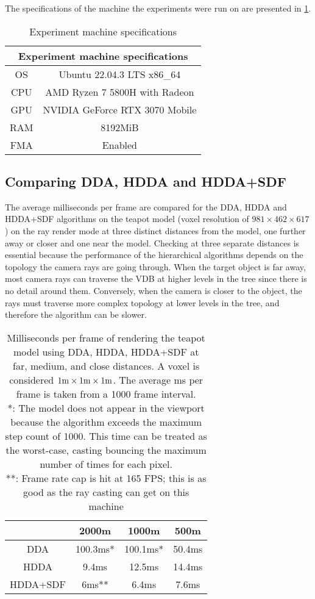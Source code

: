 The specifications of the machine the experiments were run on are presented in \cref{specs}.
\begin{table}[h]
  \centering
\begin{tabular}{|c||c|}
  \hline
  \multicolumn{2}{|c|}{Experiment machine specifications} \\
  \hline
  OS & Ubuntu 22.04.3 LTS x86\_64\\
  \hline
  CPU & AMD Ryzen 7 5800H with Radeon\\
  \hline
  GPU &  NVIDIA GeForce RTX 3070 Mobile\\
  \hline
  RAM & 8192MiB \\
  \hline
  FMA & Enabled \\
  \hline
\end{tabular}
  \caption{Experiment machine specifications}
  \label{specs}
\end{table}

\subsection{Comparing DDA, HDDA and HDDA+SDF}

The average milliseconds per frame are compared for the DDA, HDDA and HDDA+SDF algorithms on the teapot model (voxel resolution of $981\times462\times617$) on the ray render mode at three distinct distances from the model, one further away or closer and one near the model. Checking at three separate distances is essential because the performance of the hierarchical algorithms depends on the topology the camera rays are going through. When the target object is far away, most camera rays can traverse the VDB at higher levels in the tree since there is no detail around them. Conversely, when the camera is closer to the object, the rays must traverse more complex topology at lower levels in the tree, and therefore the algorithm can be slower.

\begin{table}[h]
  \centering
  \begin{tabular}{|c||c|c|c|}
    \hline
    & 2000m & 1000m & 500m \\
    \hline
    DDA & 100.3ms* & 100.1ms* & 50.4ms \\
    \hline
    HDDA & 9.4ms & 12.5ms & 14.4ms \\
    \hline
    HDDA+SDF & 6ms** & 6.4ms & 7.6ms\\
    \hline
  \end{tabular}
  \caption{Milliseconds per frame of rendering the teapot model using DDA, HDDA, HDDA+SDF at far, medium, and close distances. A voxel is considered $1\rm{m}\times1\rm{m}\times1\rm{m}$. The average ms per frame is taken from a 1000 frame interval.\\
    *: The model does not appear in the viewport because the algorithm exceeds the maximum step count of 1000. This time can be treated as the worst-case, casting bouncing the maximum number of times for each pixel.\\
    **: Frame rate cap is hit at 165 FPS; this is as good as the ray casting can get on this machine}
  \label{table:2}
\end{table}

